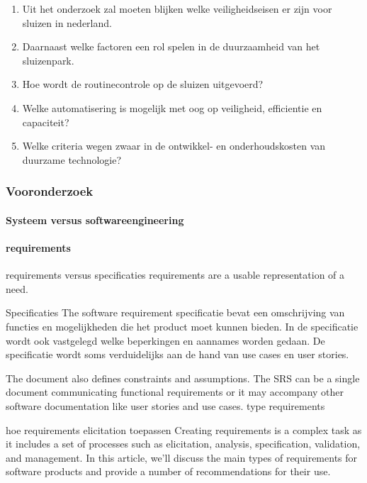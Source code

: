 \documentclass[11pt]{report} %
\begin{document}
\begin{enumerate}
  \item Uit het onderzoek zal moeten blijken welke veiligheidseisen er zijn voor sluizen in nederland. 
  \item Daarnaast welke factoren een rol spelen in de duurzaamheid van het sluizenpark.  
  \item Hoe wordt de routinecontrole op de sluizen uitgevoerd?  
   \item Welke automatisering is mogelijk met oog op veiligheid, efficientie en capaciteit?  
    \item Welke criteria wegen zwaar in de ontwikkel- en onderhoudskosten van duurzame technologie?
\end{enumerate}


\newpage
\subsubsection{Vooronderzoek }

\paragraph{Systeem versus softwareengineering}


\paragraph{requirements}
requirements versus specificaties 
requirements are a usable representation of a need.

Specificaties
The software requirement specificatie bevat een omschrijving van functies en mogelijkheden die het product moet kunnen bieden. In de specificatie wordt ook vastgelegd welke beperkingen en aannames worden gedaan. De specificatie wordt soms verduidelijks aan de hand van use cases en user stories.




The document also defines constraints and assumptions. The SRS can be a single document communicating functional requirements or it may accompany other software documentation like user stories and use cases.
type requirements 

hoe requirements elicitation toepassen 
Creating requirements is a complex task as it includes a set of processes such as elicitation, analysis, specification, validation, and management. In this article, we’ll discuss the main types of requirements for software products and provide a number of recommendations for their use.
\end{document}
